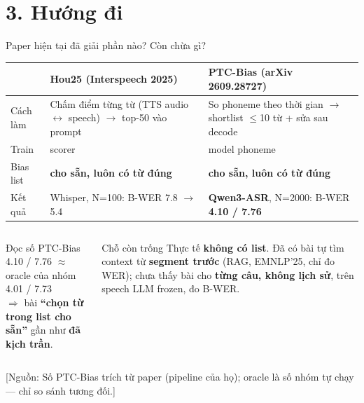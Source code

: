 \documentclass[aspectratio=169,xcolor=table]{beamer}
\newcommand{\hi}[1]{\textcolor{Primary}{\textbf{#1}}}
\newcommand{\bad}[1]{\textcolor{RiskRed}{\textbf{#1}}}
\newcommand{\src}[1]{{\tiny\color{TextGray}[Nguồn: #1]}}
\begin{document}
\section{3. Hướng đi}
\begin{frame}{Paper hiện tại đã giải phần nào? Còn chừa gì?}
\small\renewcommand{\arraystretch}{1.2}
\begin{tabular}{@{}p{2.3cm}p{5.0cm}p{5.0cm}@{}}
\toprule
& \textbf{Hou25} (Interspeech 2025) & \textbf{PTC-Bias} (arXiv 2609.28727)\\
\midrule
Cách làm & Chấm điểm từng từ (TTS audio $\leftrightarrow$ speech) $\rightarrow$ top-50 vào prompt & So phoneme theo thời gian $\rightarrow$ shortlist $\le$10 từ + sửa sau decode\\
Train & scorer & model phoneme\\
Bias list & \bad{cho sẵn, luôn có từ đúng} & \bad{cho sẵn, luôn có từ đúng}\\
Kết quả & Whisper, N=100: B-WER 7.8 $\rightarrow$ 5.4 & \hi{Qwen3-ASR}, N=2000: B-WER \textbf{4.10 / 7.76}\\
\bottomrule
\end{tabular}
\vspace{0.3cm}
\begin{columns}[T,onlytextwidth]
\begin{block}{Đọc số}
\small PTC-Bias 4.10 / 7.76 $\approx$ oracle của nhóm 4.01 / 7.73\\
$\Rightarrow$ bài \textbf{``chọn từ trong list cho sẵn''} gần như \textbf{đã kịch trần}.
\end{block}
\begin{alertblock}{Chỗ còn trống}
\small Thực tế \textbf{không có list}. Đã có bài tự tìm context từ \textbf{segment trước} (RAG, EMNLP'25, chỉ đo WER); chưa thấy bài cho \textbf{từng câu, không lịch sử}, trên speech LLM frozen, đo B-WER.
\end{alertblock}
\end{columns}
\vfill\src{Số PTC-Bias trích từ paper (pipeline của họ); oracle là số nhóm tự chạy --- chỉ so sánh tương đối.}
\end{frame}
\end{document}
